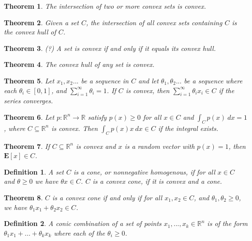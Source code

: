 \documentclass[a4paper]{article}
\newtheorem{mytheorem}{Theorem}
\newtheorem{mydef}{Definition}
\numberwithin{mytheorem}{section}
\numberwithin{mydef}{section}
\numberwithin{example}{section}
\begin{document}
\begin{mytheorem} The intersection of two or more convex sets is convex. \end{mytheorem}

\begin{mytheorem} Given a set $C$, the intersection of all convex sets containing $C$ is the convex hull of $C$. \end{mytheorem}

\begin{mytheorem} (?) A set is convex if and only if it equals its convex hull. \end{mytheorem}

\begin{mytheorem} The convex hull of any set is convex. \end{mytheorem}

\begin{mytheorem} Let $x_{1},x_{2}...$ be a sequence in $C$ and let $\theta_{1},\theta_{2}...$ be a sequence where each $\theta_{i} \in [0,1]$, and $\sum_{i = 1}^{\infty} \theta_{i} = 1 $. If $C$ is convex, then $\sum_{i = 1}^{\infty} \theta_{i}x_{i} \in C $ if the series converges. \end{mytheorem}

\begin{mytheorem} Let $p : \mathbb{R}^{n} \rightarrow \mathbb{R} $ satisfy $p(x) \geq 0$ for all $x \in C$ and $\int_{C}p(x) \ dx = 1$, where $C \subseteq \mathbb{R}^{n}$ is convex. Then $\int_{C}p(x)x \ dx \in C $ if the integral exists. \end{mytheorem}

\begin{mytheorem} If $C \subseteq \mathbb{R}^{n}$ is convex and $x$ is a random vector with $p(x) = 1$, then $\textbf{E}[x] \in C$.  \end{mytheorem}

\begin{mydef} A set $C$ is a cone, or nonnegative homogenous, if for all $x \in C$ and $\theta \geq 0$ we have $\theta x \in C$. $C$ is a convex cone, if it is convex and a cone. \end{mydef}

\begin{mytheorem} $C$ is a convex cone if and only if for all $x_{1},x_{2} \in C$, and $\theta_{1},\theta_{2} \geq 0$, we have $\theta_{1}x_{1} + \theta_{2}x_{2} \in C$.   \end{mytheorem}

\begin{mydef} A conic combination of a set of points $x_{1},...,x_{k} \in \mathbb{R}^{n}$ is of the form $\theta_{1}x_{1} + ... + \theta_{k}x_{k}$ where each of the $\theta_{i} \geq 0$.
\end{mydef}
\end{document}
